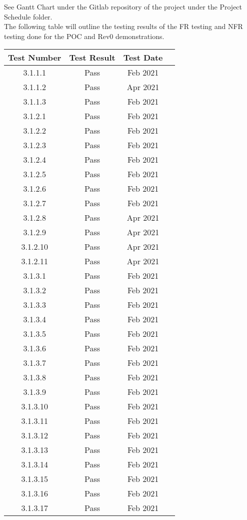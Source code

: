 \documentclass[12pt, titlepage]{article}
\begin{document}
See Gantt Chart under the Gitlab repository of the project under the Project Schedule folder.\\
The following table will outline the testing results of the FR testing and NFR testing done for the POC and Rev0 demonstrations. 
\begin{center}
{\color{red}\begin{longtable}{ |c|c|c|c| } 
\hline
Test Number & Test Result & Test Date \\
\hline
3.1.1.1 & Pass & Feb 2021 \\
3.1.1.2 & Pass & Apr 2021\\
3.1.1.3 & Pass & Feb 2021\\
3.1.2.1 & Pass & Feb 2021\\
3.1.2.2 & Pass & Feb 2021\\
3.1.2.3 & Pass & Feb 2021\\
3.1.2.4 & Pass & Feb 2021\\
3.1.2.5 & Pass & Feb 2021\\
3.1.2.6 & Pass & Feb 2021\\
3.1.2.7 & Pass & Feb 2021\\
3.1.2.8 & Pass & Apr 2021\\
3.1.2.9 & Pass & Apr 2021\\
3.1.2.10 & Pass & Apr 2021\\
3.1.2.11 & Pass & Apr 2021\\
3.1.3.1 & Pass & Feb 2021\\
3.1.3.2 & Pass & Feb 2021\\
3.1.3.3 & Pass & Feb 2021\\
3.1.3.4 & Pass & Feb 2021\\
3.1.3.5 & Pass & Feb 2021\\
3.1.3.6 & Pass & Feb 2021\\
3.1.3.7 & Pass & Feb 2021\\
3.1.3.8 & Pass & Feb 2021\\
3.1.3.9 & Pass & Feb 2021\\
3.1.3.10 & Pass & Feb 2021\\
3.1.3.11 & Pass & Feb 2021\\
3.1.3.12 & Pass & Feb 2021\\
3.1.3.13 & Pass & Feb 2021\\
3.1.3.14 & Pass & Feb 2021\\
3.1.3.15 & Pass & Feb 2021\\
3.1.3.16 & Pass & Feb 2021\\
3.1.3.17 & Pass & Feb 2021\\

\end{longtable}}
\end{center}
\end{document}
